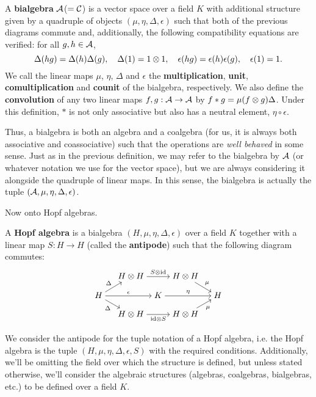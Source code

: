 A \textbf{bialgebra} $\mathcal{A}$($=\mathcal{C}$) is a vector space over a field $K$ with additional structure given by a quadruple of objects $(\mu,\eta,\Delta,\epsilon)$ such that both of the previous diagrams commute and, additionally, the following compatibility equations are verified: for all $g,h \in \mathcal{A}$,
\begin{equation}
    \Delta(hg) = \Delta(h)\Delta(g),\quad \Delta(1) = 1 \otimes 1,\quad \epsilon(hg) = \epsilon(h)\epsilon(g),\quad \epsilon(1) = 1.
\end{equation}
We call the linear maps $\mu$, $\eta$, $\Delta$ and $\epsilon$ the \textbf{multiplication}, \textbf{unit}, \textbf{comultiplication} and \textbf{counit} of the bialgebra, respectively. We also define the \textbf{convolution} of any two linear maps $f,g:\mathcal{A}\to\mathcal{A}$ by $f*g=\mu(f\otimes g)\Delta$. Under this definition, $*$ is not only associative but also has a neutral element, $\eta \circ \epsilon$.

Thus, a bialgebra is both an algebra and a coalgebra (for us, it is always both associative and coassociative) such that the operations are \emph{well behaved} in some sense. Just as in the previous definition, we may refer to the bialgebra by $\mathcal{A}$ (or whatever notation we use for the vector space), but we are always considering it alongside the quadruple of linear maps. In this sense, the bialgebra is actually the tuple $(\mathcal{A},\mu,\eta,\Delta,\epsilon)$.

Now onto Hopf algebras. 
\begin{definition}
    A \textbf{Hopf algebra} is a bialgebra $(H,\mu,\eta,\Delta,\epsilon)$ over a field $K$ together with a linear map $S:H\to H$ (called the \textbf{antipode}) such that the following diagram commutes:
    \[\begin{tikzcd}[cramped,sep=tiny]
	&& {H \otimes H} && {H \otimes H} \\
	\\
	H &&& K &&& H \\
	\\
	&& {H \otimes H} && {H \otimes H}
	\arrow["{S \otimes \id}", from=1-3, to=1-5]
	\arrow["\mu", from=1-5, to=3-7]
	\arrow["\Delta", from=3-1, to=1-3]
	\arrow["\epsilon", from=3-1, to=3-4]
	\arrow["\Delta"', from=3-1, to=5-3]
	\arrow["\eta", from=3-4, to=3-7]
	\arrow["{\id \otimes S}"', from=5-3, to=5-5]
	\arrow["\mu"', from=5-5, to=3-7]
    \end{tikzcd}\]
    \end{definition}
We consider the antipode for the tuple notation of a Hopf algebra, i.e. the Hopf algebra is the tuple $(H,\mu,\eta,\Delta,\epsilon,S)$ with the required conditions. Additionally, we'll be omitting the field over which the structure is defined, but unless stated otherwise, we'll consider the algebraic structures (algebras, coalgebras, bialgebras, etc.) to be defined over a field $K$.


